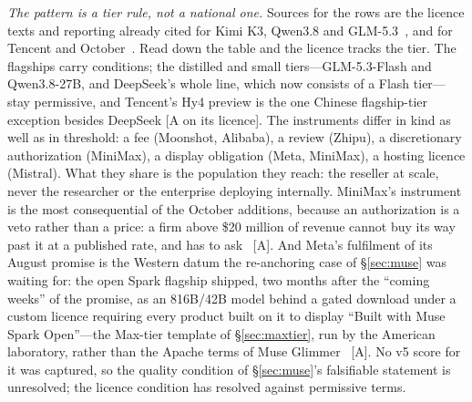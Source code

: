 \emph{The pattern is a tier rule, not a national one.} Sources for the rows are the licence texts and reporting already cited for Kimi K3, Qwen3.8 and GLM-5.3~\cite{kimi-k3-license-maas,qwen38-weights,qwen38-flash-next,glm53}, and for Tencent and October~\cite{mdl-hy4-llmref,mdl-minimax-m31,mdl-kimi-k31,mdl-cleus-oct26,mdl-mistral-large4,mdl-reflection-beam,mdl-v41flash-1017}. Read down the table and the licence tracks the tier. The flagships carry conditions; the distilled and small tiers---GLM-5.3-Flash and Qwen3.8-27B, and DeepSeek's whole line, which now consists of a Flash tier---stay permissive, and Tencent's Hy4 preview is the one Chinese flagship-tier exception besides DeepSeek [A on its licence]. The instruments differ in kind as well as in threshold: a fee (Moonshot, Alibaba), a review (Zhipu), a discretionary authorization (MiniMax), a display obligation (Meta, MiniMax), a hosting licence (Mistral). What they share is the population they reach: the reseller at scale, never the researcher or the enterprise deploying internally. MiniMax's instrument is the most consequential of the October additions, because an authorization is a veto rather than a price: a firm above \$20 million of revenue cannot buy its way past it at a published rate, and has to ask~\cite{mdl-minimax-m31} [A]. And Meta's fulfilment of its August promise is the Western datum the re-anchoring case of \S\ref{sec:muse} was waiting for: the open Spark flagship shipped, two months after the ``coming weeks'' of the promise, as an 816B/42B model behind a gated download under a custom licence requiring every product built on it to display ``Built with Muse Spark Open''---the Max-tier template of \S\ref{sec:maxtier}, run by the American laboratory, rather than the Apache terms of Muse Glimmer~\cite{mdl-cleus-oct26} [A]. No v5 score for it was captured, so the quality condition of \S\ref{sec:muse}'s falsifiable statement is unresolved; the licence condition has resolved against permissive terms.

